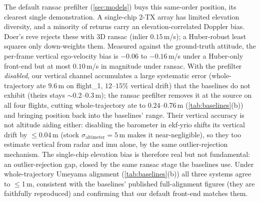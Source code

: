 The default \ac{ransac} prefilter (\autoref{sec:models}) buys this
same-order position, its clearest single demonstration.
A single-chip 2-TX array has limited
elevation diversity, and a minority of returns carry an
elevation-correlated Doppler bias.  Doer's \mbox{reve} rejects these
with 3D \ac{ransac} (inlier $0.15$\,m/s); a Huber-robust least squares only
down-weights them.  Measured against the ground-truth attitude, the
per-frame vertical ego-velocity bias is $-0.06$ to $-0.16$\,m/s under a
Huber-only front-end but at most $0.10$\,m/s in magnitude under \ac{ransac}.
With the prefilter \emph{disabled}, our vertical channel accumulates a
large systematic error (whole-trajectory \ac{ate} $9.6$\,m on flight\_1,
$12$--$15\%$ vertical drift) that the baselines do not exhibit (theirs
stays $\sim$0.2--0.3\,m); the \ac{ransac} prefilter removes it
at the source on all four flights, cutting whole-trajectory \ac{ate} to
$0.24$--$0.76$\,m (\autoref{tab:baselines}(b)) and bringing
position back into the baselines' range.  Their vertical accuracy is
not altitude aiding either: disabling the barometer in ekf-yrio shifts
its vertical drift by $\le$0.04\,m (stock $\sigma_\mathrm{altimeter}{=}5$\,m
makes it near-negligible), so they too estimate vertical from radar and
\ac{imu} alone, by the same outlier-rejection mechanism.  The single-chip
elevation bias is therefore real but not fundamental: an
outlier-rejection gap, closed by the same \ac{ransac} stage the
baselines use.  Under
whole-trajectory Umeyama alignment (\autoref{tab:baselines}(b))
all three systems agree to $\le$1\,m, consistent with the baselines'
published full-alignment figures (they are faithfully reproduced) and
confirming that our default front-end matches them.

